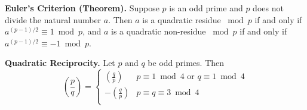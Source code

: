 \documentclass[12pt]{amsart}
\theoremstyle{plain}
\theoremstyle{definition}
\theoremstyle{remark}
\begin{document}
\noindent \textbf{Euler's Criterion (Theorem).}
Suppose $p$ is an odd prime and $p$ does not divide the natural number $a$.  Then $a$ is a quadratic residue $\bmod p$ if and only if $a^{(p-1)/2} \equiv 1 \bmod p$, and $a$ is a quadratic non-residue $\bmod p$ if and only if $a^{(p-1)/2} \equiv -1 \bmod p$.


\noindent \textbf{Quadratic Reciprocity.}
Let $p$ and $q$ be odd primes.  Then
\[ \left( \frac{p}{q}\right) = \begin{cases} 
      \left( \frac{q}{p}\right) & p \equiv 1 \bmod 4 \text{ or } q \equiv 1 \bmod 4\\
      -\left( \frac{q}{p}\right) & p \equiv q \equiv 3 \bmod 4\\
   \end{cases}
\]
\end{document}
